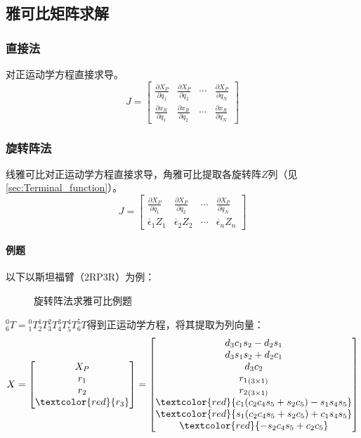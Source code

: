 \documentclass[
12pt, %
a4paper, 
oneside, %
headinclude,footinclude, %
]{scrartcl}
\begin{document}
\subsection{雅可比矩阵求解}
\subsubsection{直接法}
对正运动学方程直接求导。
$$
J = \begin{bmatrix} \frac{\partial X_P}{\partial q_1} & \frac{\partial X_P}{\partial q_2} & \cdots & \frac{\partial X_P}{\partial q_N} \\ \frac{\partial x_R}{\partial q_1} & \frac{\partial x_R}{\partial q_2} & \cdots & \frac{\partial x_R}{\partial q_N} \end{bmatrix}
$$
\subsubsection{旋转阵法}
线雅可比对正运动学方程直接求导，角雅可比提取各旋转阵$ Z $列（见\ref{sec:Terminal_function}）。
$$
J = \begin{bmatrix} \frac{\partial X_P}{\partial q_1} & \frac{\partial X_P}{\partial q_2} & \cdots & \frac{\partial X_P}{\partial q_N} \\ \overline{\epsilon}_1 Z_1 & \overline{\epsilon}_2 Z_2 & \cdots & \overline{\epsilon}_n Z_n \end{bmatrix}
$$
\paragraph{例题}
以下以斯坦福臂（2RP3R）为例：

\begin{figure}[H]
\centering
\subfloat[斯坦福臂结构图]{\texttt{[image: 4.1]}} \quad
\subfloat[参数表]{\texttt{[image: 4.2]}}
\caption[旋转阵法求雅可比例题]{旋转阵法求雅可比例题}
\end{figure}

$ _6^0T = {_1^0T}{_2^1T}{_3^2T}{_4^3T}{_5^4T}{_6^5T} $得到正运动学方程，将其提取为列向量：
{\scriptsize
$$
X = \begin{bmatrix} X_P \\ r_1 \\ r_2 \\ \textcolor{red}{r_3} \end{bmatrix}
=
\begin{bmatrix}
d_3 c_1 s_2 - d_2 s_1 \\
d_3 s_1 s_2 + d_2 c_1 \\
d_3 c_2 \\
{r_1}_{(3 \times 1)} \\
{r_2}_{(3 \times 1)} \\
\textcolor{red}{c_1(c_2 c_4 s_5 + s_2 c_5) - s_1 s_4 s_5} \\
\textcolor{red}{s_1(c_2 c_4 s_5 + s_2 c_5) + c_1 s_4 s_5} \\
\textcolor{red}{-s_2 c_4 s_5 + c_2 c_5}
\end{bmatrix}
$$}
\end{document}
